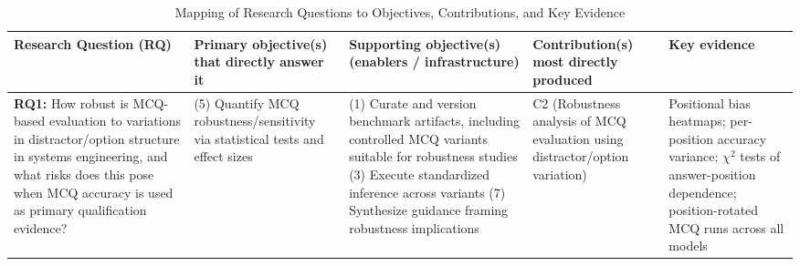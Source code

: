 
\begin{landscape}
\begin{table}[htbp]
\centering
\caption{Mapping of Research Questions to Objectives, Contributions, and Key Evidence}
\label{tab:rq_obj_contrib_evidence}

\small
\setlength{\tabcolsep}{4pt}
\renewcommand{\arraystretch}{1.25}

\begin{tabularx}{\linewidth}{p{3.0cm} X X p{2.8cm} X}
\toprule
\textbf{Research Question (RQ)} &
\textbf{Primary objective(s) that directly answer it} &
\textbf{Supporting objective(s) (enablers / infrastructure)} &
\textbf{Contribution(s) most directly produced} &
\textbf{Key evidence} \\
\midrule

\textbf{RQ1:} How robust is MCQ-based evaluation to variations in distractor/option structure in systems engineering, and what risks does this pose when MCQ accuracy is used as primary qualification evidence? &
(5) Quantify MCQ robustness/sensitivity via statistical tests and effect sizes &
(1) Curate and version benchmark artifacts, including controlled MCQ variants suitable for robustness studies\newline
(3) Execute standardized inference across variants\newline
(7) Synthesize guidance framing robustness implications &
C2 (Robustness analysis of MCQ evaluation using distractor/option variation) &
Positional bias heatmaps; per-position accuracy variance; $\chi^2$ tests of answer-position dependence; position-rotated MCQ runs across all models \\
\midrule


\end{tabularx}
\end{table}
\end{landscape}
